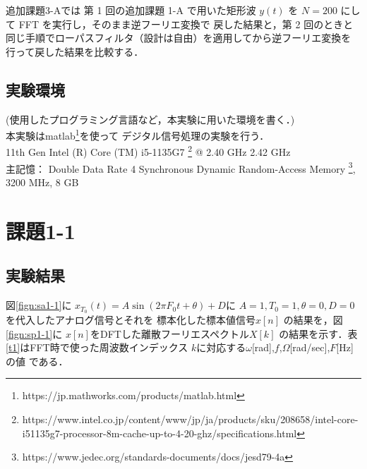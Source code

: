 \documentclass[11pt, a4paper, titlepage]{ltjsarticle}
\begin{document}
追加課題3-Aでは
第 1 回の追加課題 1-A で用いた矩形波 $y(t)$ を $N = 200$ にして FFT を実行し，そのまま逆フーリエ変換で
戻した結果と，第 2 回のときと同じ手順でローパスフィルタ（設計は自由）を適用してから逆フーリエ変換を
行って戻した結果を比較する．



\subsection*{実験環境}
(使用したプログラミング言語など，本実験に用いた環境を書く．)\\
本実験はmatlab\footnote{https://jp.mathworks.com/products/matlab.html}を使って
デジタル信号処理の実験を行う．\\
11th Gen Intel (R) Core (TM) i5-1135G7
\footnote{https://www.intel.co.jp/content/www/jp/ja/products/sku/208658/intel-core-i51135g7-processor-8m-cache-up-to-4-20-ghz/specifications.html} 
@ 2.40 GHz   2.42 GHz
\\主記憶： Double Data Rate 4 Synchronous Dynamic Random-Access Memory
\footnote{https://www.jedec.org/standards-documents/docs/jesd79-4a},
 3200 MHz, 8 GB

\newpage
\section*{課題1-1}
\subsection*{実験結果}
図\ref*{fign:sa1-1}に
$x_{T_{0}}(t)=A\sin(2\pi F_{0}t+\theta)+ D$に
$A=1,T_{0}=1,\theta=0,D=0$を代入したアナログ信号とそれを
標本化した標本値信号$x[n]$
の結果を，図\ref*{fign:sp1-1}に
$x[n]$をDFTした離散フーリエスペクトル$X[k]$
の結果を示す．表\ref*{t1}はFFT時で使った周波数インデックス
$k$に対応する$\omega$[rad],$f$,$\Omega$[rad/sec],$F$[Hz]の値
である．
\end{document}
